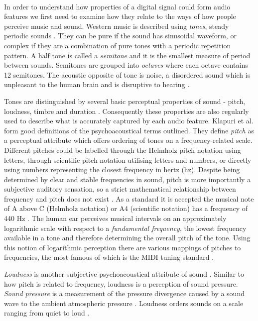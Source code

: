 \paragraph{}
In order to understand how properties of a digital signal could form audio
features we first need to examine how they relate to the ways of how people
perceive music and sound. Western music is described using \textit{tones},
steady periodic sounds \cite{wiki:tone}. They can be pure if the sound has
sinusoidal waveform, or complex if they are a combination of pure tones with a
periodic repetition pattern. A half tone is called a \textit{semitone} and it is
the smallest measure of period between sounds. Semitones are grouped into
\textit{octaves} where each octave contains 12 semitones. The acoustic opposite
of tone is noise, a disordered sound which is unpleasant to the human brain and
is disruptive to hearing \cite{music-noise}.

Tones are distinguished by several basic perceptual properties of sound - pitch,
loudness, timbre and duration \cite{acoustic-glossary-power}. Consequently these
properties are also regularly used to describe what is accurately captured by
each audio feature. Klapuri et al. \cite{klapuri2007signal} form good
definitions of the psychoacoustical terms outlined. They define \textit{pitch}
as a perceptual attribute which offers ordering of tones on a
frequency-related scale. Different pitches could be labelled through the
Helmholz pitch notation \cite{helmholtz2013sensations} using letters, through
scientific pitch notation \cite{fletcher1934loudness} utilising letters and
numbers, or directly using numbers representing the closest frequency in hertz
(hz). Despite being determined by clear and stable frequencies in sound, pitch
is more importantly a subjective auditory sensation, so a strict mathematical
relationship between frequency and pitch does not exist
\cite{acoustical1986american}. As a standard it is accepted the musical note of
A above C (Helmholz notation) or A4 (scientific notation) has a frequency of 440
Hz \cite{young1939terminology}. The human ear perceives musical intervals on an
approximately logarithmic scale with respect to a \textit{fundamental
frequency}, the lowest frequency available in a tone and therefore determining
the overall pitch of the tone. Using this notion of logarithmic perception there
are various mappings of pitches to frequencies, the most famous of which is the
MIDI tuning standard \cite{mts}.

\textit{Loudness} is another subjective psychoacoustical attribute of sound
\cite{klapuri2007signal}. Similar to how pitch is related to frequency, loudness
is a perception of sound pressure. \textit{Sound pressure} is a measurement of
the pressure divergence caused by a sound wave to the ambient atmospheric
pressure \cite{sound-pressure}. Loudness orders sounds on a scale ranging from
quiet to loud \cite{acoustical1986american}.

